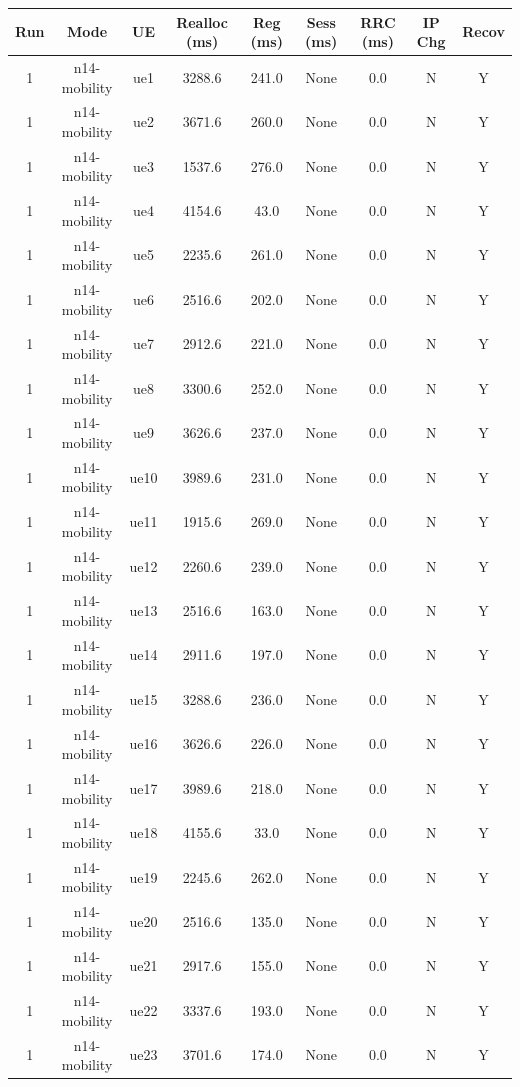 \begin{table}[ht]
\centering
\begin{tabular}{|c|c|c|c|c|c|c|c|c|}
\hline
Run & Mode & UE & Realloc (ms) & Reg (ms) & Sess (ms) & RRC (ms) & IP Chg & Recov \\
\hline
1 & n14-mobility & ue1 & 3288.6 & 241.0 & None & 0.0 & N & Y \\
1 & n14-mobility & ue2 & 3671.6 & 260.0 & None & 0.0 & N & Y \\
1 & n14-mobility & ue3 & 1537.6 & 276.0 & None & 0.0 & N & Y \\
1 & n14-mobility & ue4 & 4154.6 & 43.0 & None & 0.0 & N & Y \\
1 & n14-mobility & ue5 & 2235.6 & 261.0 & None & 0.0 & N & Y \\
1 & n14-mobility & ue6 & 2516.6 & 202.0 & None & 0.0 & N & Y \\
1 & n14-mobility & ue7 & 2912.6 & 221.0 & None & 0.0 & N & Y \\
1 & n14-mobility & ue8 & 3300.6 & 252.0 & None & 0.0 & N & Y \\
1 & n14-mobility & ue9 & 3626.6 & 237.0 & None & 0.0 & N & Y \\
1 & n14-mobility & ue10 & 3989.6 & 231.0 & None & 0.0 & N & Y \\
1 & n14-mobility & ue11 & 1915.6 & 269.0 & None & 0.0 & N & Y \\
1 & n14-mobility & ue12 & 2260.6 & 239.0 & None & 0.0 & N & Y \\
1 & n14-mobility & ue13 & 2516.6 & 163.0 & None & 0.0 & N & Y \\
1 & n14-mobility & ue14 & 2911.6 & 197.0 & None & 0.0 & N & Y \\
1 & n14-mobility & ue15 & 3288.6 & 236.0 & None & 0.0 & N & Y \\
1 & n14-mobility & ue16 & 3626.6 & 226.0 & None & 0.0 & N & Y \\
1 & n14-mobility & ue17 & 3989.6 & 218.0 & None & 0.0 & N & Y \\
1 & n14-mobility & ue18 & 4155.6 & 33.0 & None & 0.0 & N & Y \\
1 & n14-mobility & ue19 & 2245.6 & 262.0 & None & 0.0 & N & Y \\
1 & n14-mobility & ue20 & 2516.6 & 135.0 & None & 0.0 & N & Y \\
1 & n14-mobility & ue21 & 2917.6 & 155.0 & None & 0.0 & N & Y \\
1 & n14-mobility & ue22 & 3337.6 & 193.0 & None & 0.0 & N & Y \\
1 & n14-mobility & ue23 & 3701.6 & 174.0 & None & 0.0 & N & Y \\

\end{tabular}
\end{table}
